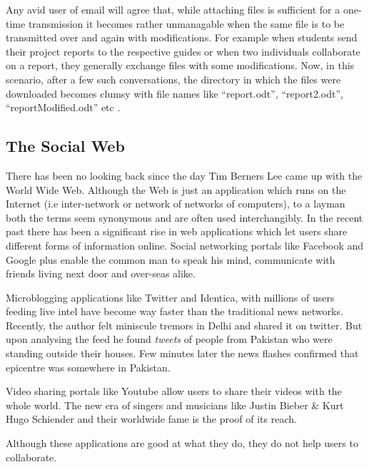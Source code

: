 Any avid user of email will agree that, while attaching files is sufficient for a one-time transmission it becomes rather unmanagable when the same file is to be transmitted over and again with modifications. For example when students send their project reports to the respective guides or when two individuals collaborate on a report, they generally exchange files with some modifications. Now, in this scenario, after a few such conversations, the directory in which the files were downloaded becomes clumsy with file names like ``report.odt'', ``report2.odt'', ``reportModified.odt'' etc .\par

\subsection{The Social Web}
There has been no looking back since the day Tim Berners Lee came up with the World Wide Web. Although the Web is just an application which runs on the Internet (i.e inter-network or network of networks of computers), to a layman both the terms seem synonymous and are often used interchangibly. In the recent past there has been a significant rise in web applications which let users share different forms of information online.
Social networking portals like Facebook and Google plus enable the common man to speak his mind, communicate with friends living next door and over-seas alike.\par 
Microblogging applications like Twitter and Identica, with millions of users feeding live intel have become way faster than the traditional news networks. Recently, the author felt miniscule tremors in Delhi and shared it on twitter. But upon analysing the feed he found \emph{tweets} of people from Pakistan who were standing outside their houses. Few minutes later the news flashes confirmed that epicentre was somewhere in Pakistan.\par
Video sharing portals like Youtube allow users to share their videos with the whole world. The new era of singers and musicians like Justin Bieber \& Kurt Hugo Schiender and their worldwide fame is the proof of its reach.\par
Although these applications are good at what they do, they do not help users to collaborate.

